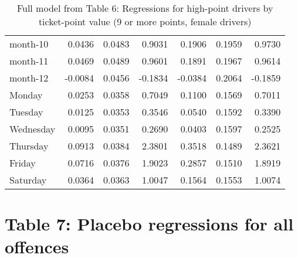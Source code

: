 \documentclass[10pt]{article}
\begin{document}
\begin{table}[ht]
\begin{tabular}{lrrrrrr}
  month-10 & 0.0436 & 0.0483 & 0.9031 & 0.1906 & 0.1959 & 0.9730 \\ 
  month-11 & 0.0469 & 0.0489 & 0.9601 & 0.1891 & 0.1967 & 0.9614 \\ 
  month-12 & -0.0084 & 0.0456 & -0.1834 & -0.0384 & 0.2064 & -0.1859 \\ 
  Monday & 0.0253 & 0.0358 & 0.7049 & 0.1100 & 0.1569 & 0.7011 \\ 
  Tuesday & 0.0125 & 0.0353 & 0.3546 & 0.0540 & 0.1592 & 0.3390 \\ 
  Wednesday & 0.0095 & 0.0351 & 0.2690 & 0.0403 & 0.1597 & 0.2525 \\ 
  Thursday & 0.0913 & 0.0384 & 2.3801 & 0.3518 & 0.1489 & 2.3621 \\ 
  Friday & 0.0716 & 0.0376 & 1.9023 & 0.2857 & 0.1510 & 1.8919 \\ 
  Saturday & 0.0364 & 0.0363 & 1.0047 & 0.1564 & 0.1553 & 1.0074 \\ 
   \hline
\end{tabular}
\caption{Full model from Table 6: Regressions for high-point drivers by ticket-point value (9 or more points, female drivers)} 
\label{tab_6_9plus_pts_no_age_F}
\end{table}


\clearpage
\pagebreak




\section{Table 7: Placebo regressions for all offences}



\end{document}
